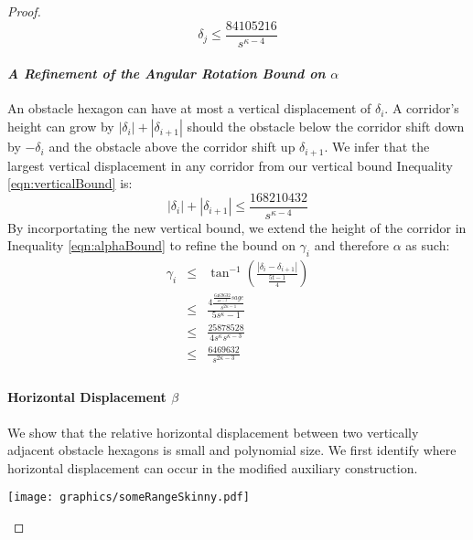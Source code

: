 \documentclass[10pt]{CSUNthesis}
\theoremstyle{plain}%
\theoremstyle{definition}
\theoremstyle{remark}
\newcommand{\lr}[1]{\left( #1 \right)}
\newcommand{\vlr}[1]{\left\vert #1 \right\vert}
\begin{document}
\begin{proof}
\begin{equation}\label{eqn:verticalBound}
\delta_j \leq \frac{84105216}{s^{\kappa-4}}
\end{equation}


\paragraph{\textit{A Refinement of the Angular Rotation Bound on $\alpha$}}
An obstacle hexagon can have at most a vertical displacement of $\delta_i$.  
A corridor's height can grow by $\vlr{\delta_i} + \vlr{\delta_{i+1}}$ should the obstacle below the corridor shift down by $-\delta_i$ and the obstacle above the corridor shift up $\delta_{i+1}$.  
We infer that the largest vertical displacement in any corridor from our vertical bound Inequality \ref{eqn:verticalBound} is:
$$\vlr{\delta_i} + \vlr{\delta_{i+1}} \leq \frac{168210432}{s^{\kappa-4}}$$
By incorportating the new vertical bound, we extend the height of the corridor in Inequality \ref{eqn:alphaBound} to refine the bound on $\gamma_i$ and therefore $\alpha$ as such:
\begin{equation}\label{eqn:alphaBoundRefined}
\begin{array}{rcl}
\gamma_i & \leq & \tan^{-1} \lr{\frac{\vlr{\delta_i - \delta_{i+1}}}
									 {	\frac{5t -1}{4}	}
								}\\
&\leq& \frac{4 \frac{\frac{6469632}{s^{\kappa-3}}sage}{s^{2\kappa-1}}	}
			  {	5s^\kappa -1}\\
&\leq& \frac{ 25878528 }
			  {	4s^\kappa	s^{\kappa-3}} \\
&\leq& \frac{6469632}{s^{2\kappa-3}}\\
\end{array} 
\end{equation}

\paragraph{Horizontal Displacement $\beta$}

We show that the relative horizontal displacement between two vertically adjacent obstacle hexagons is small and polynomial size.
We first identify where horizontal displacement can occur in the modified auxiliary construction.  

\begin{minipage}{\linewidth}
\begin{center}
\texttt{[image: graphics/someRangeSkinny.pdf]}
\label{fig:someRangeSkinny.pdf}
\end{center}
\end{minipage}


\end{proof}
\end{document}
